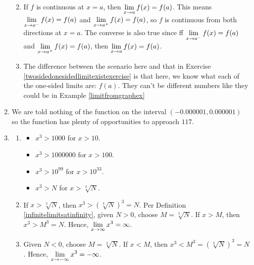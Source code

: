 \documentclass{ximera}
\begin{document}
\begin{enumerate}
\begin{enumerate}
\smallskip

\item If $f$ is continuous at $x=a$, then $\ds{\lim_{x \rightarrow a} f(x) = f(a)}$.  This means  $\ds{\lim_{x \rightarrow a^{-}} f(x) = f(a)}$ and  $\ds{\lim_{x \rightarrow a^{+}} f(x) = f(a)}$, so $f$ is continuous from both directions at $x=a$. The converse is also true since  ff $\ds{\lim_{x \rightarrow a^{-}} f(x) = f(a)}$ and  $\ds{\lim_{x \rightarrow a^{+}} f(x) = f(a)}$, then $\ds{\lim_{x \rightarrow a} f(x) = f(a)}$.

\smallskip

\item  The difference between the scenario here and that in Exercise \ref{twosidedonesidedlimitexistexercise} is that here, we know what each of the one-sided limits are: $f(a)$. They can't be different numbers like they could be in  Example \ref{limitfromgraphex}

\smallskip

\end{enumerate}


\item  We are told nothing of the function on the interval $(-0.000001, 0.000001 )$ so the function has plenty of opportunities to approach $117$.  


\item \begin{enumerate}

\item \begin{itemize} \item  $x^3 > 1000$ for $x > 10$.

\item  $x^3 > 1000000$ for $x > 100$.

\item  $x^3 > 10^{99}$ for $x > 10^{33}$.

\item  $x^3 > N$ for $x > \sqrt[3]{N}$.

\end{itemize}


\item If $x > \sqrt[3]{N}$, then $x^3 > \left(\sqrt[3]{N} \right)^3 = N$.  Per  Definition \ref{infinitelimitsatinfinity}, given $N>0$, choose $M = \sqrt[3]{N}$.  If $x > M$, then $x^3 > M^3 = N$. Hence,  $\ds{\lim_{x \rightarrow \infty} x^3 = \infty}$.

\smallskip

\item Given $N<0$, choose $M = \sqrt[3]{N}$.  If $x< M$, then $x^3 < M^3 = \left(\sqrt[3]{N}\right)^3 = N$.  Hence,   $\ds{\lim_{x \rightarrow -\infty} x^3 = -\infty}$.

\end{enumerate}
 
\end{enumerate}
\end{document}
